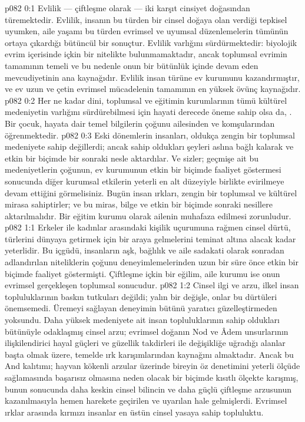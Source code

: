 \vs p082 0:1 Evlilik --- çiftleşme olarak --- iki karşıt cinsiyet doğasından türemektedir. Evlilik, insanın bu türden bir cinsel doğaya olan verdiği tepkisel uyumken, aile yaşamı bu türden evrimsel ve uyumsal düzenlemelerin tümünün ortaya çıkardığı bütüncül bir sonuçtur. Evlilik varlığını sürdürmektedir: biyolojik evrim içerisinde içkin bir nitelikte bulunmamaktadır, ancak toplumsal evrimin tamamının temeli ve bu nedenle onun bir bütünlük içinde devam eden mevcudiyetinin ana kaynağıdır. Evlilik insan türüne ev kurumunu kazandırmıştır, ve ev uzun ve çetin evrimsel mücadelenin tamamının en yüksek övünç kaynağıdır.
\vs p082 0:2 Her ne kadar dini, toplumsal ve eğitimin kurumlarının tümü kültürel medeniyetin varlığını sürdürebilmesi için hayati derecede öneme sahip olsa da, . Bir çocuk, hayata dair temel bilgilerin çoğunu ailesinden ve komşularından öğrenmektedir.
\vs p082 0:3 Eski dönemlerin insanları, oldukça zengin bir toplumsal medeniyete sahip değillerdi; ancak sahip oldukları şeyleri aslına bağlı kalarak ve etkin bir biçimde bir sonraki nesle aktardılar. Ve sizler; geçmişe ait bu medeniyetlerin çoğunun, ev kurumunun etkin bir biçimde faaliyet göstermesi sonucunda diğer kurumsal etkilerin yeterli en alt düzeyiyle birlikte evirilmeye devam ettiğini görmelisiniz. Bugün insan ırkları, zengin bir toplumsal ve kültürel mirasa sahiptirler; ve bu miras, bilge ve etkin bir biçimde sonraki nesillere aktarılmalıdır. Bir eğitim kurumu olarak ailenin muhafaza edilmesi zorunludur.
\vs p082 1:1 Erkeler ile kadınlar arasındaki kişilik uçurumuna rağmen cinsel dürtü, türlerini dünyaya getirmek için bir araya gelmelerini teminat altına alacak kadar yeterlidir. Bu içgüdü, insanların aşk, bağlılık ve aile sadakati olarak sonradan adlandırılan niteliklerin çoğunu deneyimlemelerinden uzun bir süre önce etkin bir biçimde faaliyet göstermişti. Çiftleşme içkin bir eğilim, aile kurumu ise onun evrimsel gerçekleşen toplumsal sonucudur.
\vs p082 1:2 Cinsel ilgi ve arzu, ilkel insan topluluklarının baskın tutkuları değildi; yalın bir değişle, onlar bu dürtüleri önemsemedi. Üremeyi sağlayan deneyimin bütünü yaratıcı güzelleştirmeden yoksundu. Daha yüksek medeniyete ait insan topluluklarının sahip oldukları bütünüyle odaklaşmış cinsel arzu; evrimsel doğanın Nod ve Âdem unsurlarının ilişkilendirici hayal güçleri ve güzellik takdirleri ile değişikliğe uğradığı alanlar başta olmak üzere, temelde ırk karışımlarından kaynağını almaktadır. Ancak bu And kalıtımı; hayvan kökenli arzular üzerinde bireyin öz denetimini yeterli ölçüde sağlamasında başarısız olmasına neden olacak bir biçimde kısıtlı ölçekte karışmış, bunun sonucunda daha keskin cinsel bilincin ve daha güçlü çiftleşme arzusunun kazanılmasıyla hemen harekete geçirilen ve uyarılan hale gelmişlerdi. Evrimsel ırklar arasında kırmızı insanlar en üstün cinsel yasaya sahip topluluktu.
